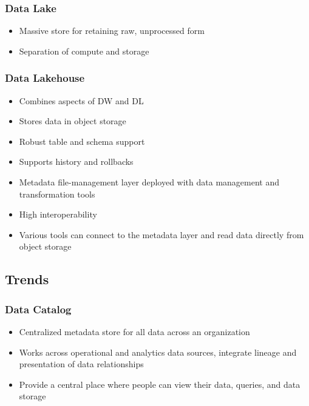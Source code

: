 \documentclass[11pt]{scrartcl}
\begin{document}
\subsubsection*{Data Lake}
\begin{itemize}
	\item Massive store for retaining raw, unprocessed form
	\item Separation of compute and storage
\end{itemize}

\subsubsection*{Data Lakehouse}
\begin{itemize}
	\item Combines aspects of DW and DL
	\item Stores data in object storage
	\item Robust table and schema support
	\item Supports history and rollbacks
	\item Metadata file-management layer deployed with data management and transformation tools
	\item High interoperability
	\item Various tools can connect to the metadata layer and read data directly from object storage
\end{itemize}


\subsection*{Trends}
\subsubsection*{Data Catalog}
\begin{itemize}
	\item Centralized metadata store for all data across an organization
	\item Works across operational and analytics data sources, integrate lineage and presentation of data relationships
	\item Provide a central place where people can view their data, queries, and data storage
\end{itemize}
\end{document}

